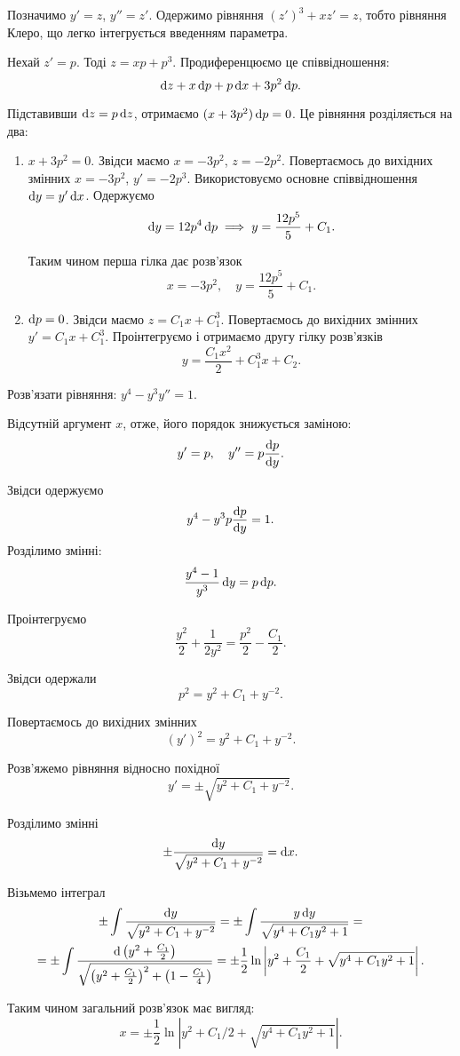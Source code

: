 \begin{solution}
	Позначимо $y'=z$, $y''=z'$. Одержимо рівняння $(z')^3+xz'=z$, тобто рівняння Клеро, що легко інтегрується введенням параметра. \parvskip

	Нехай $z' = p$. Тоді $z=xp+p^3$. Продиференцюємо це співвідношення: \[\mathop{}\!\mathrm{d} z + x \mathop{}\!\mathrm{d} p + p \mathop{}\!\mathrm{d} x + 3 p^2 \mathop{}\!\mathrm{d} p.\]
	
	Підставивши $\mathop{}\!\mathrm{d} z = p \mathop{}\!\mathrm{d} z$, отримаємо $(x+3p^2)\mathop{}\!\mathrm{d} p = 0$. Це рівняння розділяється на два:
	\begin{enumerate}
		\item $x + 3p^2 = 0$. Звідси маємо $x = -3p^2$, $z=-2p^2$. Повертаємось до вихідних змінних $x=-3p^2$, $y'=-2p^3$. Використовуємо основне співвідношення $\mathop{}\!\mathrm{d} y = y' \mathop{}\!\mathrm{d} x$. Одержуємо \[ \mathop{}\!\mathrm{d} y = 12 p^4 \mathop{}\!\mathrm{d} p \implies y = \frac{12p^5}{5} + C_1.\]
		
		Таким чином перша гілка дає розв'язок \[ x = -3p^2, \quad y=\frac{12p^5}{5} + C_1.\]
		
		\item $\mathop{}\!\mathrm{d} p = 0$. Звідси маємо $z = C_1 x + C_1^3$. Повертаємось до вихідних змінних $y'=C_1x+C_1^3$. Проінтегруємо і отримаємо другу гілку розв'язків \[y=\frac{C_1x^2}{2}+C_1^3x+C_2.\]
	\end{enumerate}
\end{solution}

\begin{example}
	Розв'язати рівняння: $y^4 - y^3  y'' = 1$.
\end{example}

\begin{solution}
	Відсутній аргумент $x$, отже, його порядок знижується заміною: \[y'=p,\quad y''=p\frac{\mathop{}\!\mathrm{d} p}{\mathop{}\!\mathrm{d} y}.\]
	
	Звідси одержуємо \[ y^4 - y^3  p  \frac{\mathop{}\!\mathrm{d} p}{\mathop{}\!\mathrm{d} y} = 1.\] Розділимо змінні: \[ \frac{y^4-1}{y^3}  \mathop{}\!\mathrm{d} y=p  \mathop{}\!\mathrm{d} p.\]
	
	Проінтегруємо \[ \frac{y^2}{2}+\frac{1}{2y^2}=\frac{p^2}{2}-\frac{C_1}{2}.\]
	
	Звідси одержали \[p^2=y^2+C_1+y^{-2}.\]
	
	Повертаємось до вихідних змінних \[(y')^2=y^2+C_1+y^{-2}.\]
	
	Розв'яжемо рівняння відносно похідної \[ y' = \pm \sqrt{y^2 + C_1 + y^{-2}}.\]
	
	Розділимо змінні \[ \pm\frac{\mathop{}\!\mathrm{d} y}{\sqrt{y^2+C_1+y^{-2}}}=\mathop{}\!\mathrm{d} x.\]
	
	Візьмемо інтеграл 
	\begin{multline*}
	    \pm \int \frac{\mathop{}\!\mathrm{d} y}{\sqrt{y^2+C_1+y^{-2}}} = \pm \int \frac{y \mathop{}\!\mathrm{d} y}{\sqrt{y^4+C_1y^2+1}} = \\
	    = \pm \int \frac{\mathop{}\!\mathrm{d} \left(y^2 + \frac{C_1}{2}\right)}{\sqrt{\left(y^2+\frac{C_1}{2}\right)^2+\left(1-\frac{C_1}{4}\right)}} = \pm \frac12 \ln \left| y^2 + \frac{C_1}{2} + \sqrt{y^4+C_1y^2+1}\right|.
	\end{multline*}
	
	Таким чином загальний розв'язок має вигляд: \[x = \pm \frac12 \ln \left| y^2 + C_1/2 + \sqrt{y^4+C_1y^2+1}\right|.\]
\end{solution}

